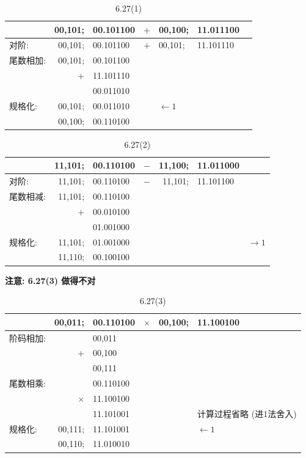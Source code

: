 \documentclass[UTF8]{report}
\newenvironment{solution}{{\noindent\hskip 2em \bf 解 \quad}}{}
\begin{document}
\begin{solution}
    \begin{table}[htb]
        \centering
        \caption{6.27(1)}
        \label{tab:my-table}
        \begin{tabular}{l|rlclll}
         & 00,101; & 00.101100 & $+$ & 00,100; & 11.011100  \\ \hline
        对阶: & 00,101; & 00.101100 & $+$ & 00,101; & 11.101110  \\ \hline
        尾数相加: & 00,101; & 00.101100 &  &  &   \\
         & $+$ & 11.101110 &  &  &   \\ \cline{2-3}
         &  & 00.011010 &  &  & \\ \hline
        规格化: & 00,101; & 00.011010 &  & $\leftarrow 1$ &   \\
         & 00,100; & 00.110100 &  &  &  
        \end{tabular}
    \end{table}

    \begin{table}[htb]
        \centering
        \caption{6.27(2)}
        \label{tab:6_27_2}
        \begin{tabular}{l|rlcrll}
         & 11,101; & 00.110100 & $-$ & 11,100; & 11.011000 &  \\ \hline
        对阶: & 11,101; & 00.110100 & $-$ & 11,101; & 11.101100 &  \\ \hline
        尾数相减: & 11,101; & 00.110100 &  &  &  &  \\
         & $+$ & 00.010100 &  &  &  &  \\ \cline{2-3}
         &   & 01.001000 &  &  &  &  \\ \hline
        规格化: & 11,101; & 01.001000 &  &  &  & $\rightarrow 1$ \\
         & 11,110; & 00.100100 &  &  &  & 
        \end{tabular}
    \end{table}

    \textbf{注意: 6.27(3) 做得不对}

    \begin{table}[htb]
        \centering
        \caption{6.27(3)}
        \label{tab:6_27_3}
        \begin{tabular}{l|rlcrl}
         & 00,011; & 00.110100 & $\times$ & 00,100; & 11.100100 \\ \hline
        阶码相加: &  & 00,011 &  &  &  \\
         & $+$ & 00,100 &  &  &  \\ \cline{2-3}
         &  & 00,111 &  &  &  \\ \hline
        尾数相乘: &  & 00.110100 &  &  &  \\
         & $\times$ & 11.100100 &  &  &  \\ \cline{2-3}
         &  & 11.101001 &  &  & 计算过程省略 (进1法舍入) \\ \hline
        规格化: & 00,111; & 11.101001 &  &  & $\leftarrow 1$ \\
         & 00,110; & 11.010010 &  &  & 
        \end{tabular}
    \end{table}


\end{solution}
\end{document}
